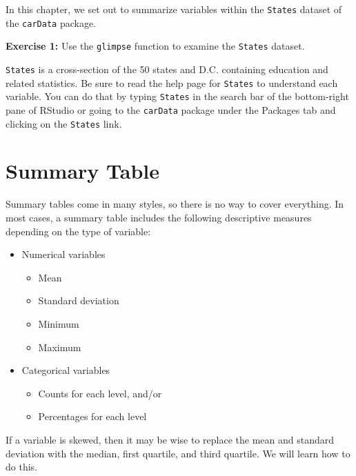 \documentclass[
]{book}
\providecommand{\tightlist}{%
  \setlength{\itemsep}{0pt}\setlength{\parskip}{0pt}}
\newenvironment{learncheck}%
{%
  \par\vspace{\baselineskip}\noindent 
  \color{Exercise}\begin{itshape}%
  \par\vspace{\baselineskip}\noindent\ignorespaces 
}%
{%
  \end{itshape}\ignorespacesafterend 
}
\begin{document}
In this chapter, we set out to summarize variables within the \texttt{States} dataset of the \texttt{carData} package.

\begin{learncheck}
\textbf{Exercise 1:} Use the \texttt{glimpse} function to examine the
\texttt{States} dataset.
\end{learncheck}

\texttt{States} is a cross-section of the 50 states and D.C. containing education and related statistics. Be sure to read the help page for \texttt{States} to understand each variable. You can do that by typing \texttt{States} in the search bar of the bottom-right pane of RStudio or going to the \texttt{carData} package under the Packages tab and clicking on the \texttt{States} link.

\hypertarget{summary-table}{%
\section{Summary Table}\label{summary-table}}

Summary tables come in many styles, so there is no way to cover everything. In most cases, a summary table includes the following descriptive measures depending on the type of variable:

\begin{itemize}
\tightlist
\item
  Numerical variables

  \begin{itemize}
  \tightlist
  \item
    Mean
  \item
    Standard deviation
  \item
    Minimum
  \item
    Maximum
  \end{itemize}
\item
  Categorical variables

  \begin{itemize}
  \tightlist
  \item
    Counts for each level, and/or
  \item
    Percentages for each level
  \end{itemize}
\end{itemize}

If a variable is skewed, then it may be wise to replace the mean and standard deviation with the median, first quartile, and third quartile. We will learn how to do this.
\end{document}
